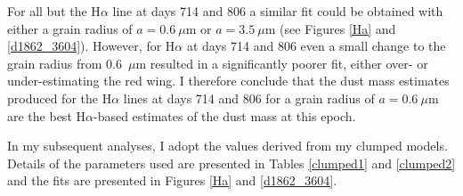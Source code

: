 For all but the H$\alpha$ line at days 714 and 806 a similar fit could be 
obtained with either a grain radius of $a=0.6~\mu$m or $a=3.5~\mu$m (see 
Figures \ref{Ha} and \ref{d1862_3604}).  However, for H$\alpha$ 
at days 714 and 806 even a small change to the grain radius from 0.6~$\mu$m resulted in a 
significantly poorer fit, either over- or under-estimating the red wing. 
I therefore conclude that the dust mass estimates produced for the 
H$\alpha$ lines at days 714 and 806 for a grain radius of $a=0.6~\mu$m are 
the best H$\alpha$-based estimates of the dust mass at this epoch.



In my subsequent analyses, I adopt the values derived from my clumped 
models.  Details of the parameters used are presented in 
Tables \ref{clumped1} and \ref{clumped2} and the fits are presented in Figures 
\ref{Ha} and \ref{d1862_3604}.

